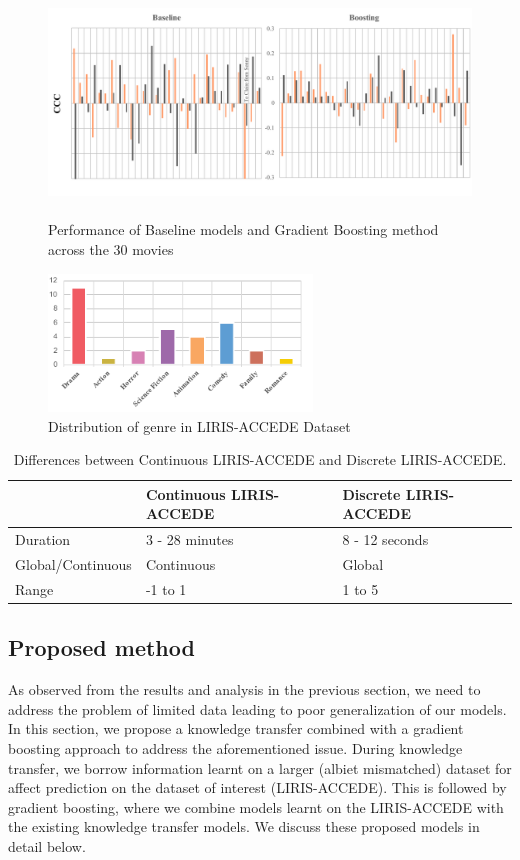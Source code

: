 \documentclass{article}
\begin{document}
\begin{figure}[t]
\includegraphics[width=\textwidth, height = 6cm]{images/comparison2.pdf}
\centering
\caption{Performance of Baseline models and Gradient Boosting method across the 30 movies}
\label{comparison}
\end{figure}

\begin{figure}[t]
\includegraphics[width=7cm]{genre2}
\centering
\caption{Distribution of genre in LIRIS-ACCEDE Dataset}
\label{genre}
\end{figure}

\begin{table}[t]
\centering
\begin{tabular}{|l|p{2.2cm}|p{2.2cm}|}
\hline
				& Continuous LIRIS-ACCEDE	& Discrete LIRIS-ACCEDE \\ \hline
Duration			& 3 - 28 minutes			& 8 - 12 seconds		\\ \hline	
Global/Continuous	& Continuous				& Global 				\\ \hline
Range			& -1 to 1					& 1 to 5				\\ \hline
\end{tabular}
\caption{Differences between Continuous LIRIS-ACCEDE and Discrete LIRIS-ACCEDE.}
\label{differences}
\end{table}

\subsection{Proposed method}
As observed from the results and analysis in the previous section, we need to address the problem of limited data leading to poor generalization of our models.
In this section, we propose a knowledge transfer combined with a gradient boosting approach to address the aforementioned issue.
During knowledge transfer, we borrow information learnt on a larger (albiet mismatched) dataset for affect prediction on the dataset of interest (LIRIS-ACCEDE).
This is followed by gradient boosting, where we combine models learnt on the LIRIS-ACCEDE with the existing knowledge transfer models.
We discuss these proposed models in detail below. 
\end{document}
